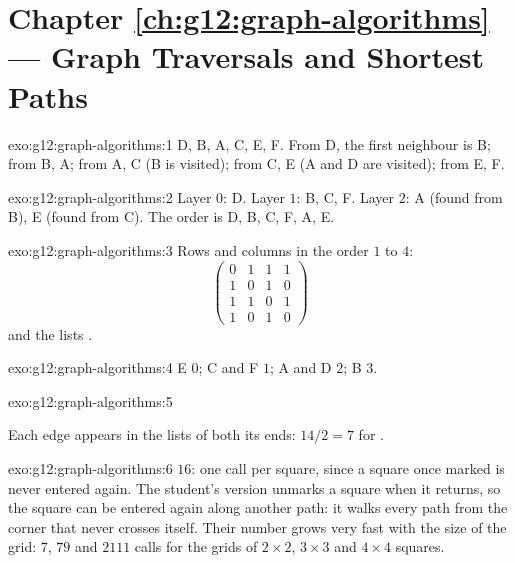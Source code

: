 \section*{Chapter \ref{ch:g12:graph-algorithms} --- Graph Traversals and Shortest Paths}

\begin{solution}{exo:g12:graph-algorithms:1}
D, B, A, C, E, F. From D, the first neighbour is B; from B, A; from A, C (B is visited); from C, E (A and D are
visited); from E, F.
\end{solution}

\begin{solution}{exo:g12:graph-algorithms:2}
Layer $0$: D. Layer $1$: B, C, F. Layer $2$: A (found from B), E (found from C). The order is D, B, C, F, A, E.
\end{solution}

\begin{solution}{exo:g12:graph-algorithms:3}
Rows and columns in the order $1$ to $4$:
\[
\begin{pmatrix} 0 & 1 & 1 & 1 \\ 1 & 0 & 1 & 0 \\ 1 & 1 & 0 & 1 \\ 1 & 0 & 1 & 0 \end{pmatrix}
\]
and the lists .
\end{solution}

\begin{solution}{exo:g12:graph-algorithms:4}
E $0$; C and F $1$; A and D $2$; B $3$.
\end{solution}

\begin{solution}{exo:g12:graph-algorithms:5}
\smallskip\noindent\hspace*{2em}

\noindent\hspace*{4em}

\smallskip\noindent Each edge appears in the lists of both its ends: $14 / 2 = 7$ for .
\end{solution}

\begin{solution}{exo:g12:graph-algorithms:6}
$16$: one call per square, since a square once marked is never entered again. The student's version unmarks a square
when it returns, so the square can be entered again along another path: it walks every path from the corner that
never crosses itself. Their number grows very fast with the size of the grid: $7$, $79$ and $2111$ calls for the
grids of $2 \times 2$, $3 \times 3$ and $4 \times 4$ squares.
\end{solution}

